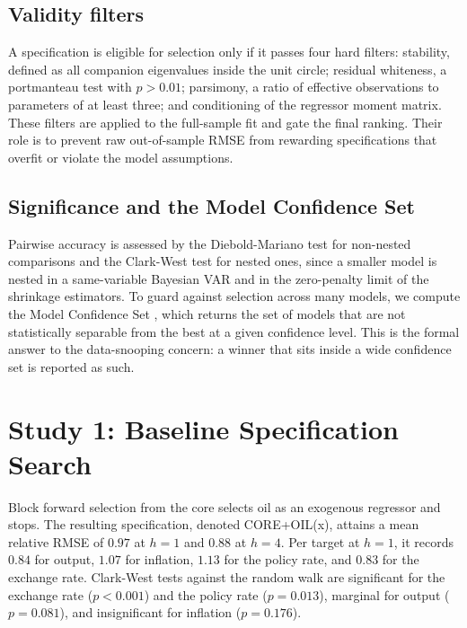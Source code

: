 \documentclass[conference]{IEEEtran}
\begin{document}
\subsection{Validity filters}
A specification is eligible for selection only if it passes four hard filters: stability, defined as all companion eigenvalues inside the unit circle; residual whiteness, a portmanteau test with $p>0.01$; parsimony, a ratio of effective observations to parameters of at least three; and conditioning of the regressor moment matrix. These filters are applied to the full-sample fit and gate the final ranking. Their role is to prevent raw out-of-sample RMSE from rewarding specifications that overfit or violate the model assumptions.

\subsection{Significance and the Model Confidence Set}
Pairwise accuracy is assessed by the Diebold-Mariano test \cite{dm1995} for non-nested comparisons and the Clark-West test \cite{cw2007} for nested ones, since a smaller model is nested in a same-variable Bayesian VAR and in the zero-penalty limit of the shrinkage estimators. To guard against selection across many models, we compute the Model Confidence Set \cite{hln2011}, which returns the set of models that are not statistically separable from the best at a given confidence level. This is the formal answer to the data-snooping concern: a winner that sits inside a wide confidence set is reported as such.

\section{Study 1: Baseline Specification Search}
Block forward selection from the core selects oil as an exogenous regressor and stops. The resulting specification, denoted CORE+OIL(x), attains a mean relative RMSE of $0.97$ at $h=1$ and $0.88$ at $h=4$. Per target at $h=1$, it records $0.84$ for output, $1.07$ for inflation, $1.13$ for the policy rate, and $0.83$ for the exchange rate. Clark-West tests against the random walk are significant for the exchange rate ($p<0.001$) and the policy rate ($p=0.013$), marginal for output ($p=0.081$), and insignificant for inflation ($p=0.176$).
\end{document}
